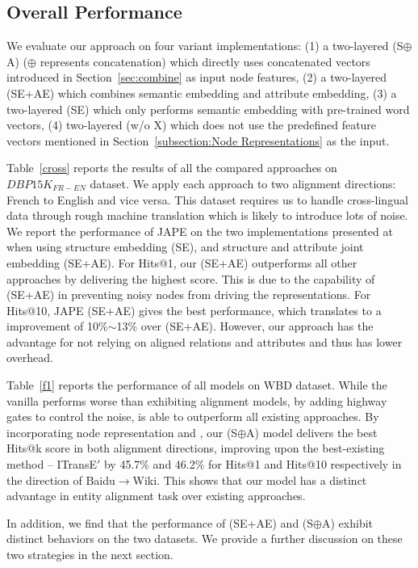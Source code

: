 \subsection{Overall Performance\label{overall}}
We evaluate our approach on four variant implementations: (1) a two-layered \HRGCN (S$\oplus$A) ($\oplus$ represents concatenation) which directly uses concatenated vectors
introduced in Section~\ref{sec:combine} as input node features, (2) a two-layered \HRGCN (SE+AE) which combines semantic embedding and
attribute embedding, (3) a two-layered \HRGCN (SE) which only performs semantic embedding with pre-trained word vectors, (4) two-layered
\HRGCN (w/o X) which does not use the predefined feature vectors mentioned in Section~\ref{subsection:Node
		Representations} as the input.

 Table~\ref{cross} reports the results of all the compared approaches on $DBP15K_{FR-EN}$
dataset. We apply each approach
 to two alignment directions: French to English and vice versa. This dataset requires us to handle
cross-lingual data through rough machine translation which is likely to introduce lots of noise. We report the performance of JAPE on the
two implementations presented at
 ~\cite{sun2017cross} when using structure embedding (SE), and structure and attribute joint embedding (SE+AE).
For Hits@1, our \HRGCN (SE+AE) outperforms all other approaches by delivering the highest score. This is due to the capability of \HRGCN
(SE+AE) in preventing noisy nodes from driving the \KG representations. For Hits@10, JAPE (SE+AE) gives the best performance, which
translates to a improvement of 10\%$\sim$13\% over \HRGCN (SE+AE). However, our approach has the advantage for not relying on aligned
relations and attributes and thus has lower overhead.


 Table~\ref{f1} reports the performance of all models on WBD dataset. While the vanilla \GCN performs worse than
exhibiting alignment models, by adding highway gates to control the noise, \HGCN is able to outperform all existing approaches. By
incorporating node representation and \RGCN, our \HRGCN (S$\oplus$A) model delivers the best Hits@k score in both alignment directions,
improving upon the best-existing method -- ITransE$'$ by 45.7\% and 46.2\% for Hits@1 and Hits@10 respectively in the direction of
Baidu$\rightarrow$Wiki. This shows that our model has a distinct advantage in entity alignment task over existing approaches.

In addition, we find that the performance of \HRGCN (SE+AE) and \HRGCN (S$\oplus$A) exhibit distinct behaviors on the two datasets. We
provide a further discussion on these two strategies in the next section.



